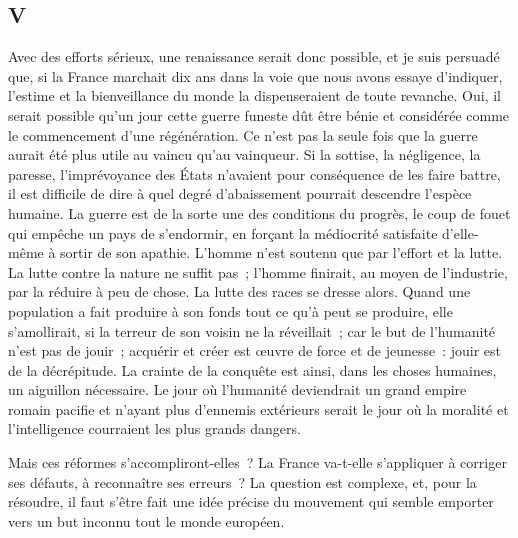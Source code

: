 \documentclass[french,twoside]{book} %
\begin{document}
\subsection[{V}]{V}
\noindent Avec des efforts sérieux, une renaissance serait donc possible, et je suis persuadé que, si la France marchait dix ans dans la voie que nous avons essaye d’indiquer, l’estime et la bienveillance du monde la dispenseraient de toute revanche. Oui, il serait possible qu’un jour cette guerre funeste dût être bénie et considérée comme le commencement d’une régénération. Ce n’est pas la seule fois que la guerre aurait été plus utile au vaincu qu’au vainqueur. Si la sottise, la négligence, la paresse, l’imprévoyance des États n’avaient pour conséquence de les faire battre, il est difficile de dire à quel degré d’abaissement pourrait descendre l’espèce humaine. La guerre est de la sorte une des conditions du progrès, le coup de fouet qui empêche un pays de s’endormir, en forçant la médiocrité satisfaite d’elle-même à sortir de son apathie. L’homme n’est soutenu que par l’effort et la lutte. La lutte contre la nature ne suffit pas ; l’homme finirait, au moyen de l’industrie, par la réduire à peu de chose. La lutte des races se dresse alors. Quand une population a fait produire à son fonds tout ce qu’à peut se produire, elle s’amollirait, si la terreur de son voisin ne la réveillait ; car le but de l’humanité n’est pas de jouir ; acquérir et créer est œuvre de force et de jeunesse : jouir est de la décrépitude. La crainte de la conquête est ainsi, dans les choses humaines, un aiguillon nécessaire. Le jour où l’humanité deviendrait un grand empire romain pacifie et n’ayant plus d’ennemis extérieurs serait le jour où la moralité et l’intelligence courraient les plus grands dangers.\par
Mais ces réformes s’accompliront-elles ? La France va-t-elle s’appliquer à corriger ses défauts, à reconnaître ses erreurs ? La question est complexe, et, pour la résoudre, il faut s’être fait une idée précise du mouvement qui semble emporter vers un but inconnu tout le monde européen.\par
\end{document}
